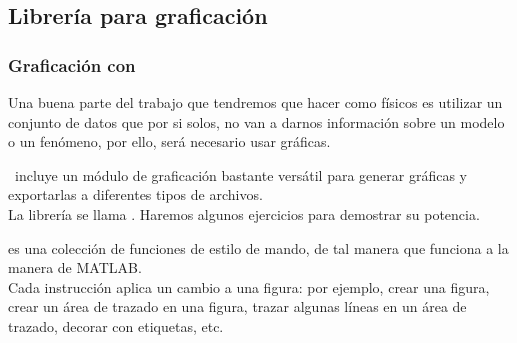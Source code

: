\subsection{Librería para graficación}
\begin{frame}
\frametitle{Graficación con \python}
Una buena parte del trabajo que tendremos que hacer como físicos es utilizar un conjunto de datos que por si solos, no van a darnos información sobre un modelo o un fenómeno, por ello, será necesario usar gráficas.
\end{frame}
\begin{frame}
\python\ incluye un módulo de graficación bastante versátil para generar gráficas y exportarlas a diferentes tipos de archivos.
\\
\medskip
La librería se llama . Haremos algunos ejercicios para demostrar su potencia.
\end{frame}
\begin{frame}
 es una colección de funciones de estilo de mando, de tal manera que  funciona a la manera de MATLAB.
\\
\bigskip
Cada instrucción  aplica un cambio a una figura: por ejemplo, crear una figura, crear un área de trazado en una figura, trazar algunas líneas en un área de trazado, decorar con etiquetas, etc.
\end{frame}
